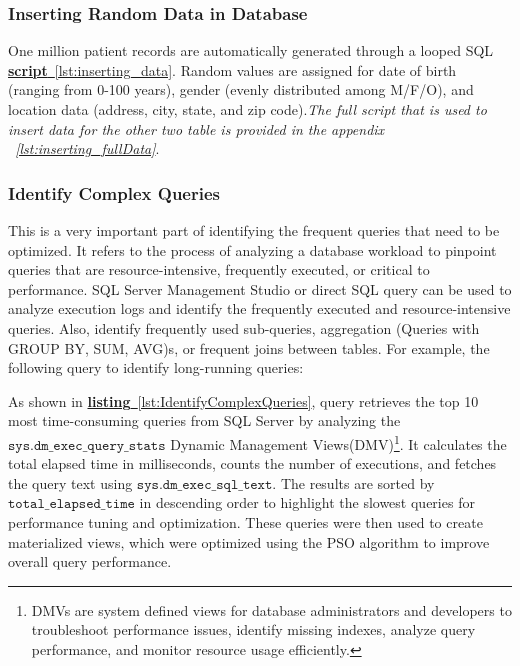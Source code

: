 
\subsubsection{Inserting Random Data in Database}
One million patient records are automatically generated through a looped SQL \hyperref[lst:inserting_data]{\textbf{script}~\ref{lst:inserting_data}}. Random values are assigned for date of birth (ranging from 0-100 years), gender (evenly distributed among M/F/O), and location data (address, city, state, and zip code).\textit{The full script that is used to insert data for the other two table is provided in the appendix ~\ref{lst:inserting_fullData}}.\vspace{.4cm}

 

\subsubsection{Identify Complex Queries} This is a very important part of identifying the frequent queries that need to be optimized. It refers to the process of analyzing a database workload to pinpoint queries that are resource-intensive, frequently executed, or critical to performance. SQL Server Management Studio or direct SQL query can be used to analyze execution logs and identify the frequently executed and resource-intensive queries. Also, identify frequently used sub-queries, aggregation (Queries with GROUP BY, SUM, AVG)s, or frequent joins between tables. For example, the following query to identify long-running queries: \vspace{.4cm}



As shown in \hyperref[lst:IdentifyComplexQueries]{\textbf{listing}~\ref{lst:IdentifyComplexQueries}}, query retrieves the top 10 most time-consuming queries from SQL Server by analyzing the \(\texttt{sys.dm\_exec\_query\_stats}\) Dynamic Management Views(DMV)\footnote{DMVs are system defined views for database administrators and developers to troubleshoot performance issues, identify missing indexes, analyze query performance, and monitor resource usage efficiently.}. It calculates the total elapsed time in milliseconds, counts the number of executions, and fetches the query text using \(\texttt{sys.dm\_exec\_sql\_text}\). The results are sorted by \(\texttt{total\_elapsed\_time}\) in descending order to highlight the slowest queries for performance tuning and optimization. These queries were then used to create materialized views, which were optimized using the PSO algorithm to improve overall query performance.

